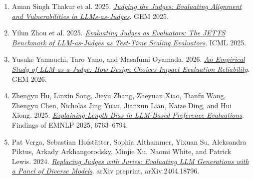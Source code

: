 \documentclass[10pt]{article}
\begin{document}
\begin{enumerate}[leftmargin=*,itemsep=0pt,topsep=1pt]
\item Aman Singh Thakur et al. 2025. \href{https://aclanthology.org/2025.gem-1.33/}{\textit{Judging the Judges: Evaluating Alignment and Vulnerabilities in LLMs-as-Judges}}. GEM 2025.
\item Yilun Zhou et al. 2025. \href{https://arxiv.org/abs/2504.15253}{\textit{Evaluating Judges as Evaluators: The JETTS Benchmark of LLM-as-Judges as Test-Time Scaling Evaluators}}. ICML 2025.
\item Yusuke Yamauchi, Taro Yano, and Masafumi Oyamada. 2026. \href{https://aclanthology.org/2026.gem-main.19/}{\textit{An Empirical Study of LLM-as-a-Judge: How Design Choices Impact Evaluation Reliability}}. GEM 2026.
\item Zhengyu Hu, Linxin Song, Jieyu Zhang, Zheyuan Xiao, Tianfu Wang, Zhengyu Chen, Nicholas Jing Yuan, Jianxun Lian, Kaize Ding, and Hui Xiong. 2025. \href{https://aclanthology.org/2025.findings-emnlp.358/}{\textit{Explaining Length Bias in LLM-Based Preference Evaluations}}. Findings of EMNLP 2025, 6763--6794.
\item Pat Verga, Sebastian Hofstätter, Sophia Althammer, Yixuan Su, Aleksandra Piktus, Arkady Arkhangorodsky, Minjie Xu, Naomi White, and Patrick Lewis. 2024. \href{https://arxiv.org/abs/2404.18796}{\textit{Replacing Judges with Juries: Evaluating LLM Generations with a Panel of Diverse Models}}. arXiv preprint, arXiv:2404.18796.
\end{enumerate}
\end{document}
